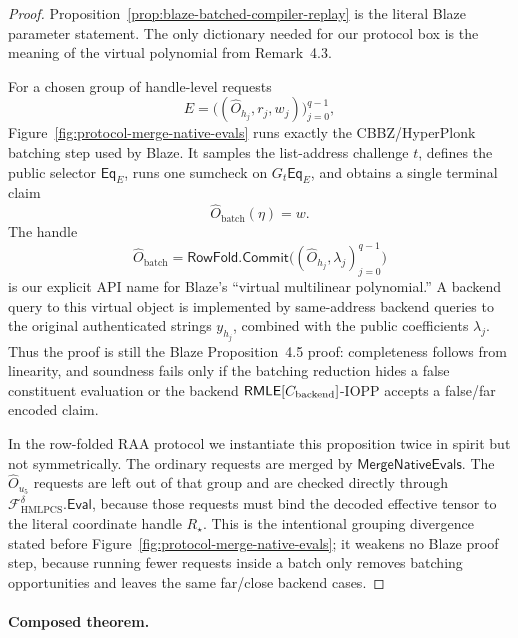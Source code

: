 \begin{proof}
Proposition~\ref{prop:blaze-batched-compiler-replay} is the literal Blaze
parameter statement.  The only dictionary needed for our protocol box is the
meaning of the virtual polynomial from Remark~4.3.

For a chosen group of handle-level requests
\[
  E=\bigl((\widehat O_{h_j},r_j,w_j)\bigr)_{j=0}^{q-1},
\]
Figure~\ref{fig:protocol-merge-native-evals} runs exactly the
CBBZ/HyperPlonk batching step used by Blaze.  It samples the list-address
challenge \(t\), defines the public selector \(\mathsf{Eq}_E\), runs one
sumcheck on \(G_t\mathsf{Eq}_E\), and obtains a single terminal claim
\[
  \widehat O_{\mathrm{batch}}(\eta)=w.
\]
The handle
\[
  \widehat O_{\mathrm{batch}}
  =
  \mathsf{RowFold.Commit}
  \bigl((\widehat O_{h_j},\lambda_j)_{j=0}^{q-1}\bigr)
\]
is our explicit API name for Blaze's ``virtual multilinear polynomial.''  A
backend query to this virtual object is implemented by same-address backend
queries to the original authenticated strings \(y_{h_j}\), combined with the
public coefficients \(\lambda_j\).  Thus the proof is still the Blaze
Proposition~4.5 proof: completeness follows from linearity, and soundness
fails only if the batching reduction hides a false constituent evaluation or
the backend \(\mathsf{RMLE}[C_{\mathrm{backend}}]\)-IOPP accepts a false/far encoded
claim.

In the row-folded RAA protocol we instantiate this proposition twice in spirit
but not symmetrically.  The ordinary requests are merged by
\(\mathsf{MergeNativeEvals}\).  The \(\widehat O_{u_5}\) requests are left out
of that group and are checked directly through
\(\mathcal F_{\mathrm{HMLPCS}}^\delta.\mathsf{Eval}\), because those requests
must bind the decoded effective tensor to the literal coordinate handle
\(R_\star\).  This is the intentional grouping divergence stated before
Figure~\ref{fig:protocol-merge-native-evals}; it weakens no Blaze proof step,
because running fewer requests inside a batch only removes batching
opportunities and leaves the same far/close backend cases.
\end{proof}

\paragraph{Composed theorem.}

